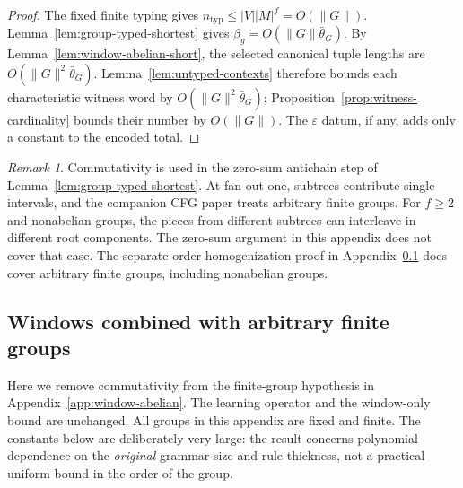 \documentclass[11pt]{article}
\numberwithin{equation}{section}
\theoremstyle{plain}
\theoremstyle{definition}
\theoremstyle{remark}
\newtheorem{remark}[theorem]{Remark}
\newcommand{\eps}{\varepsilon}
\theoremstyle{plain}
\begin{document}
\begin{proof}
The fixed finite typing gives
$n_{\mathrm{typ}}\le|V||M|^f=O(\|G\|)$.
Lemma~\ref{lem:group-typed-shortest}
gives $\beta_g=O(\|G\|\bar\theta_G)$.
By Lemma~\ref{lem:window-abelian-short},
the selected canonical tuple lengths are
$O(\|G\|^2\bar\theta_G)$.
Lemma~\ref{lem:untyped-contexts}
therefore bounds each characteristic
witness word by $O(\|G\|^2\bar\theta_G)$;
Proposition~\ref{prop:witness-cardinality}
bounds their number by $O(\|G\|)$.
The $\eps$ datum, if any, adds only a
constant to the encoded total.
\end{proof}

\begin{remark}
Commutativity is used in the zero-sum
antichain step of
Lemma~\ref{lem:group-typed-shortest}.
At fan-out one, subtrees contribute
single intervals, and the companion CFG
paper treats arbitrary finite groups.
For $f\ge2$ and nonabelian groups,
the pieces from different subtrees can
interleave in different root components.
The zero-sum argument in this appendix does not cover
that case.  The separate order-homogenization proof in
Appendix~\ref{app:window-group-v82} does cover arbitrary
finite groups, including nonabelian groups.
\end{remark}


\subsection{Windows combined with arbitrary finite groups}
\label{app:window-group-v82}

Here we remove commutativity from the finite-group hypothesis in
Appendix~\ref{app:window-abelian}.  The learning operator and the
window-only bound are unchanged.  All groups in this appendix are
fixed and finite.  The constants below are deliberately very large:
the result concerns polynomial dependence on the \emph{original}
grammar size and rule thickness, not a practical uniform bound in
the order of the group.
\end{document}

